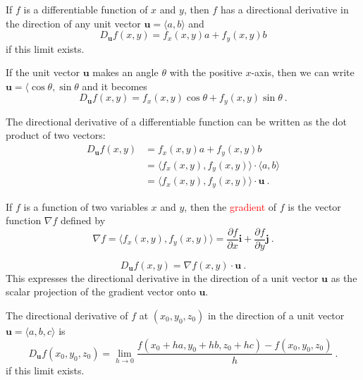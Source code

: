 \documentclass[12pt,a4paper]{article}
\renewcommand{\vec}[1]{\boldsymbol{#1}}
\begin{document}
\begin{tcolorbox}[colback=green!5,colframe=green!40!black,title= Theorem]
If $f$ is a differentiable function of $x$ and $y$, then $f$ has a directional derivative in the direction of any unit vector $\vec{u} = \langle a, b\rangle$ and
\begin{equation*}
D_{\vec{u}} f(x, y) = f_x(x, y) a +f_y(x, y) b
\end{equation*}
if this limit exists.
\end{tcolorbox}
If the unit vector $\vec{u}$ makes an angle $\theta$ with the positive $x$-axis, then we can write $\vec{u} = \langle \cos \theta, \sin \theta$ and it becomes
\begin{equation}
D_{\vec{u}} f(x, y) = f_x(x, y) \cos \theta +f_y(x, y) \sin \theta ~.
\end{equation}


The directional derivative of a differentiable function can be written as the dot product of two vectors:
\begin{align*}
D_{\vec{u}} f(x, y) &= f_x(x, y) a +f_y(x, y) b \\
&= \langle f_x(x,y), f_y(x,y)\rangle \cdot \langle a, b\rangle \\
&=  \langle f_x(x,y), f_y(x,y)\rangle \cdot \vec{u} ~.
\end{align*}

\begin{tcolorbox}[colback=green!5,colframe=green!40!black,title= Definition]
If $f$ is a function of two variables $x$ and $y$, then the \textcolor{red}{gradient} of $f$ is the vector function $\nabla f$ defined by
\begin{equation*}
\nabla f = \langle f_x(x,y), f_y(x,y)\rangle = \dfrac{\partial f}{\partial x} \vec{i} +\dfrac{\partial f}{\partial y} \vec{j} ~.
\end{equation*}
\end{tcolorbox}

\begin{equation}
D_{\vec{u}} f(x, y) = \nabla f (x,y) \cdot \vec{u} ~.
\end{equation}
This expresses the directional derivative in the direction of a unit vector $\vec{u}$ as the scalar projection of the gradient vector onto $\vec{u}$.


\begin{tcolorbox}[colback=green!5,colframe=green!40!black,title= Definition]
The directional derivative of $f$ at $(x_0, y_0, z_0)$ in the direction of a unit vector $\vec{u} = \langle a, b, c\rangle$ is
\begin{equation*}
D_{\vec{u}} f(x_0, y_0, z_0) =  \underset{h \rightarrow 0}\lim \dfrac{f(x_0 +h a, y_0 +h b, z_0 +hc) -f(x_0, y_0, z_0)}{h} ~.
\end{equation*}
if this limit exists.
\end{tcolorbox}
\end{document}
